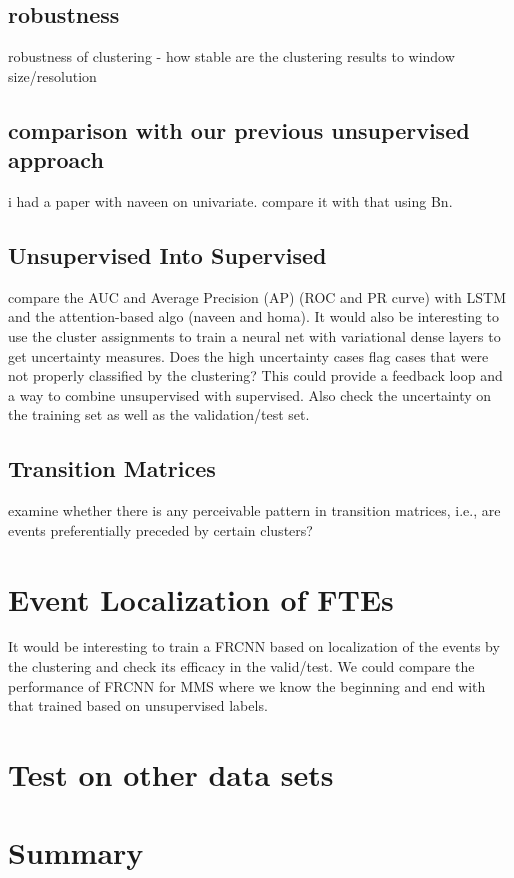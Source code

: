 \documentclass[aps,preprint,superscriptaddress]{revtex4}
\begin{document}
\subsection{robustness}
robustness of clustering - how stable are the clustering results to window size/resolution
\subsection{comparison with our previous unsupervised approach}
i had a paper with naveen on univariate. compare it with that using Bn.

\subsection{Unsupervised Into Supervised}
compare the AUC and Average Precision (AP) (ROC and PR curve) with LSTM and the attention-based algo (naveen and homa).  It would also be interesting to use the cluster assignments to train a neural net with variational dense layers to get uncertainty measures. Does the high uncertainty cases flag cases that were not properly classified by the clustering? This could provide a feedback loop and a way to combine unsupervised with supervised. 
Also check the uncertainty on the training set as well as the validation/test set.  
\label{sec:supervised}

\subsection{Transition Matrices}
examine whether there is any perceivable pattern in transition matrices, i.e., are events preferentially preceded by certain clusters?
\label{sec:transition}


\section{Event Localization of FTEs}
\label{sec:manifolderFTE2}
It would be interesting to train a FRCNN based on localization of the events by the clustering and check its efficacy in the valid/test. We could compare the performance of FRCNN for MMS where we know the beginning and end with that trained based on unsupervised labels.


\section{Test on other data sets}
\label{sec:manifolderother}


\label{sec:feature}

\section{Summary}
\label{sec:summary}

\begin{acknowledgments}

\end{acknowledgments}
\end{document}
